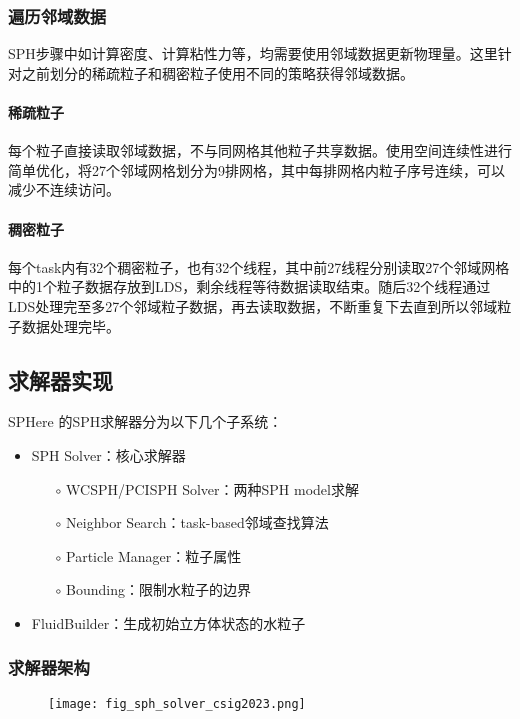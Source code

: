 \subsubsection{遍历邻域数据}
SPH步骤中如计算密度、计算粘性力等，均需要使用邻域数据更新物理量。这里针对之前划分的稀疏粒子和稠密粒子使用不同的策略获得邻域数据。

\paragraph{稀疏粒子}
每个粒子直接读取邻域数据，不与同网格其他粒子共享数据。使用空间连续性进行简单优化，将27个邻域网格划分为9排网格，其中每排网格内粒子序号连续，可以减少不连续访问。

\paragraph{稠密粒子}
每个task内有32个稠密粒子，也有32个线程，其中前27线程分别读取27个邻域网格中的1个粒子数据存放到LDS，剩余线程等待数据读取结束。随后32个线程通过LDS处理完至多27个邻域粒子数据，再去读取数据，不断重复下去直到所以邻域粒子数据处理完毕。

\subsection{求解器实现}
SPHere 的SPH求解器分为以下几个子系统：
\begin{itemize}
	\item SPH Solver：核心求解器
	      \begin{itemize}
		      \item[$\circ$] WCSPH/PCISPH Solver：两种SPH model求解
		      \item[$\circ$] Neighbor Search：task-based邻域查找算法
		      \item[$\circ$] Particle Manager：粒子属性
		      \item[$\circ$] Bounding：限制水粒子的边界
	      \end{itemize}
	\item FluidBuilder：生成初始立方体状态的水粒子
\end{itemize}
\subsubsection{求解器架构}

\begin{figure}[H]
	\centering
	\texttt{[image: fig\_sph\_solver\_csig2023.png]}
\end{figure}

